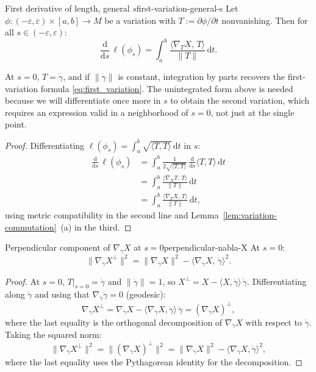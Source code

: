 \begin{colorlem}{First derivative of length, general $s$}{first-variation-general-s}
Let $\phi : (-\varepsilon, \varepsilon) \times [a, b] \to M$ be a variation with $T := \partial\phi/\partial t$ nonvanishing. Then for all $s \in (-\varepsilon, \varepsilon)$:
\[
\frac{\mathrm{d}}{\mathrm{d}s}\,\ell(\phi_s) = \int_a^b \frac{\langle \nabla_T X,\, T\rangle}{\|T\|}\,\mathrm{d}t.
\]
\end{colorlem}

\begin{colremark}{}{}
At $s = 0$, $T = \dot\gamma$, and if $\|\dot\gamma\|$ is constant, integration by parts recovers the first-variation formula \eqref{eq:first_variation}. The unintegrated form above is needed because we will differentiate once more in $s$ to obtain the second variation, which requires an expression valid in a neighborhood of $s = 0$, not just at the single point.
\end{colremark}

\begin{proof}
Differentiating $\ell(\phi_s) = \int_a^b \sqrt{\langle T, T\rangle}\,\mathrm{d}t$ in $s$:
\begin{align*}
\frac{\mathrm{d}}{\mathrm{d}s}\,\ell(\phi_s) 
&= \int_a^b \frac{1}{2\sqrt{\langle T, T\rangle}}\,\frac{\mathrm{d}}{\mathrm{d}s}\langle T, T\rangle\,\mathrm{d}t \\
&= \int_a^b \frac{\langle \nabla_X T,\, T\rangle}{\|T\|}\,\mathrm{d}t \\
&= \int_a^b \frac{\langle \nabla_T X,\, T\rangle}{\|T\|}\,\mathrm{d}t,
\end{align*}
using metric compatibility in the second line and Lemma~\ref{lem:variation-commutation}~(a) in the third. \qedhere
\end{proof}


\begin{colorlem}{Perpendicular component of $\nabla_{\dot\gamma} X$ at $s = 0$}{perpendicular-nabla-X}
At $s = 0$:
\[
\|\nabla_{\dot\gamma} X^\perp\|^2 = \|\nabla_{\dot\gamma} X\|^2 - \langle \nabla_{\dot\gamma} X,\, \dot\gamma\rangle^2.
\]
\end{colorlem}

\begin{proof}
At $s = 0$, $T|_{s=0} = \dot\gamma$ and $\|\dot\gamma\| = 1$, so $X^\perp = X - \langle X, \dot\gamma\rangle\,\dot\gamma$. Differentiating along $\dot\gamma$ and using that $\nabla_{\dot\gamma}\dot\gamma = 0$ (geodesic):
\[
\nabla_{\dot\gamma} X^\perp = \nabla_{\dot\gamma} X - \langle \nabla_{\dot\gamma} X, \dot\gamma\rangle\,\dot\gamma = (\nabla_{\dot\gamma} X)^\perp,
\]
where the last equality is the orthogonal decomposition of $\nabla_{\dot\gamma} X$ with respect to $\dot\gamma$. Taking the squared norm:
\[
\|\nabla_{\dot\gamma} X^\perp\|^2 = \|(\nabla_{\dot\gamma} X)^\perp\|^2 = \|\nabla_{\dot\gamma} X\|^2 - \langle \nabla_{\dot\gamma} X, \dot\gamma\rangle^2,
\]
where the last equality uses the Pythagorean identity for the decomposition. \qedhere
\end{proof}




